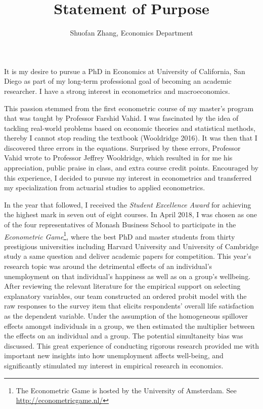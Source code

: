 \documentclass[12pt,]{article}
\title{Statement of Purpose}
\author{Shuofan Zhang, Economics Department}
\date{}
\let\rmarkdownfootnote\footnote%
\def\footnote{\protect\rmarkdownfootnote}
\begin{document}
\maketitle


It is my desire to pursue a PhD in Economics at University of
California, San Diego as part of my long-term professional goal of
becoming an academic researcher. I have a strong interest in
econometrics and macroeconomics.

This passion stemmed from the first econometric course of my master's
program that was taught by Professor Farshid Vahid. I was fascinated by
the idea of tackling real-world problems based on economic theories and
statistical methods, thereby I cannot stop reading the textbook
(Wooldridge 2016). It was then that I discovered three errors in the
equations. Surprised by these errors, Professor Vahid wrote to Professor
Jeffrey Wooldridge, which resulted in for me his appreciation, public
praise in class, and extra course credit points. Encouraged by this
experience, I decided to pursue my interest in econometrics and
transferred my specialization from actuarial studies to applied
econometrics.

In the year that followed, I received the \emph{Student Excellence
Award} for achieving the highest mark in seven out of eight courses. In
April 2018, I was chosen as one of the four representatives of Monash
Business School to participate in the \emph{Econometric Game}\footnote{The
  Econometric Game is hosted by the University of Amsterdam. See
  \url{http://econometricgame.nl/}}, where the best PhD and master
students from thirty prestigious universities including Harvard
University and University of Cambridge study a same question and deliver
academic papers for competition. This year's research topic was around
the detrimental effects of an individual's unemployment on that
individual's happiness as well as on a group's wellbeing. After
reviewing the relevant literature for the empirical support on selecting
explanatory variables, our team constructed an ordered probit model with
the raw responses to the survey item that elicits respondents' overall
life satisfaction as the dependent variable. Under the assumption of the
homogeneous spillover effects amongst individuals in a group, we then
estimated the multiplier between the effects on an individual and a
group. The potential simultaneity bias was discussed. This great
experience of conducting rigorous research provided me with important
new insights into how unemployment affects well-being, and significantly
stimulated my interest in empirical research in economics.
\end{document}
